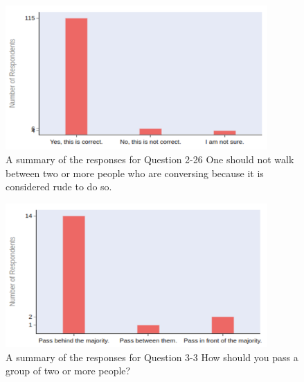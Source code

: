 \documentclass{CSSRforAfrica}
\begin{document}
\begin{figure}[tb]
\begin{center}
\includegraphics[width=100mm,angle=0]{images/consensus1.png}
\end{center}
\vspace{-5mm}
\caption{A summary of the responses for Question 2-26 One should not walk between two or more people who are conversing because it is considered rude to do so.}
\label{fig:consensus1}       
\end{figure}


\begin{figure}[tb]
\begin{center}
\includegraphics[width=100mm,angle=0]{images/consensus2.png}
\end{center}
\vspace{-5mm}
\caption{A summary of the responses for Question 3-3 How should you pass a group of two or more people?}
\label{fig:consensus2}       
\end{figure}
\end{document}
